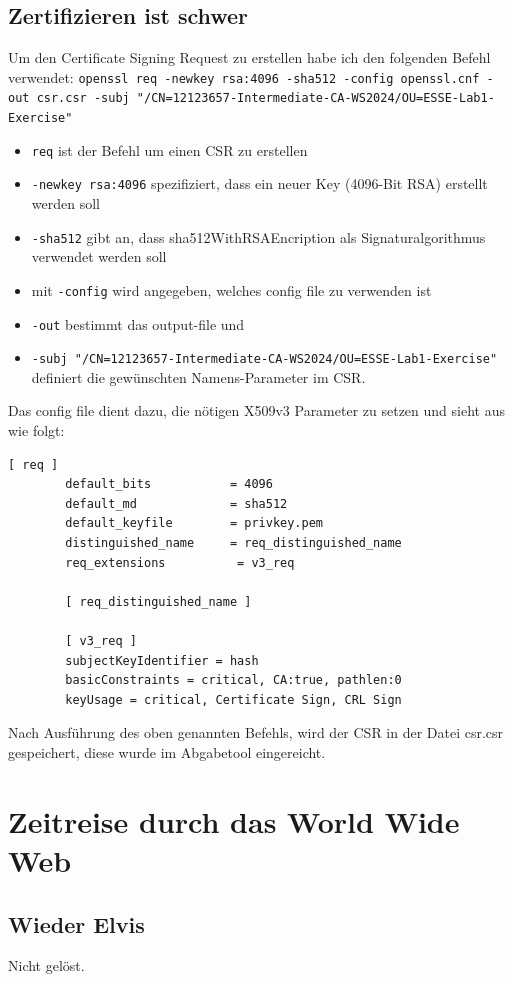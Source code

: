 \documentclass[12pt, a4paper, titlepage, oneside]{scrartcl}
\begin{document}
	\subsection{Zertifizieren ist schwer}
	Um den Certificate Signing Request zu erstellen habe ich den folgenden Befehl
	verwendet: \lstinline{openssl req -newkey rsa:4096 -sha512 -config openssl.cnf -out csr.csr -subj "/CN=12123657-Intermediate-CA-WS2024/OU=ESSE-Lab1-Exercise"}
	\begin{itemize}
		\item \lstinline{req} ist der Befehl um einen CSR zu erstellen
		\item \lstinline{-newkey rsa:4096} spezifiziert, dass ein neuer Key (4096-Bit RSA) erstellt werden soll
		\item \lstinline{-sha512} gibt an, dass sha512WithRSAEncription als Signaturalgorithmus verwendet werden soll
		\item mit \lstinline{-config} wird angegeben, welches config file zu verwenden ist
		\item \lstinline{-out} bestimmt das output-file und
		\item \lstinline{-subj "/CN=12123657-Intermediate-CA-WS2024/OU=ESSE-Lab1-Exercise"} definiert die gewünschten Namens-Parameter im CSR.
	\end{itemize}
	Das config file dient dazu, die nötigen X509v3 Parameter zu setzen und sieht aus wie folgt:
	\begin{lstlisting}[caption=openssl.cnf,label=code:opensslConfig,style=simple]
		[ req ]
		default_bits           = 4096
		default_md             = sha512
		default_keyfile        = privkey.pem
		distinguished_name     = req_distinguished_name
		req_extensions          = v3_req

		[ req_distinguished_name ]

		[ v3_req ]
		subjectKeyIdentifier = hash
		basicConstraints = critical, CA:true, pathlen:0
		keyUsage = critical, Certificate Sign, CRL Sign
	\end{lstlisting}
	Nach Ausführung des oben genannten Befehls, wird der CSR in der Datei csr.csr gespeichert,
	diese wurde im Abgabetool eingereicht.

	\section{Zeitreise durch das World Wide Web}

	\subsection{Wieder Elvis}
	Nicht gelöst.
\end{document}
